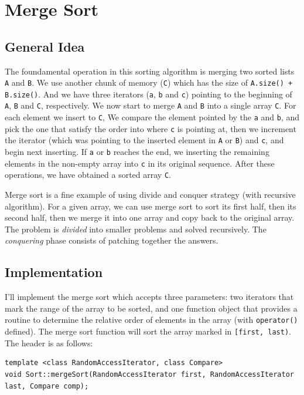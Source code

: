 \documentclass[12pt]{book}
\begin{document}
\chapter{Merge Sort}
\label{sec:orgcc2d984}
\section{General Idea}
\label{sec:org3d0bf7f}

The foundamental operation in this sorting algorithm is merging two sorted lists \texttt{A} and \texttt{B}. We use another chunk of memory (\texttt{C}) which has the size of \texttt{A.size() + B.size()}. And we have three iterators (\texttt{a}, \texttt{b} and \texttt{c}) pointing to the beginning of \texttt{A}, \texttt{B} and \texttt{C}, respectively. We now start to merge \texttt{A} and \texttt{B} into a single array \texttt{C}. For each element we insert to \texttt{C}, We compare the element pointed by the \texttt{a} and \texttt{b}, and pick the one that satisfy the order into where \texttt{c} is pointing at, then we increment the iterator (which was pointing to the inserted element in \texttt{A} or \texttt{B}) and \texttt{c}, and begin next inserting. If \texttt{a} or \texttt{b} reaches the end, we inserting the remaining elements in the non-empty array into \texttt{c} in its original sequence. After these operations, we have obtained a sorted array \texttt{C}.

Merge sort is a fine example of using divide and conquer strategy (with recursive algorithm). For a given array, we can use merge sort to sort its first half, then its second half, then we merge it into one array and copy back to the original array. The problem is \emph{divided} into smaller problems and solved recursively. The \emph{conquering} phase consists of patching together the answers.
\section{Implementation}
\label{sec:org1003fbd}

I'll implement the merge sort which accepts three parameters: two iterators that mark the range of the array to be sorted, and one function object that provides a routine to determine the relative order of elements in the array (with \texttt{operator()} defined). The merge sort function will sort the array marked in \texttt{[first, last)}. The header is as follows:
\begin{verbatim}
template <class RandomAccessIterator, class Compare>
void Sort::mergeSort(RandomAccessIterator first, RandomAccessIterator last, Compare comp);
\end{verbatim}
\end{document}
